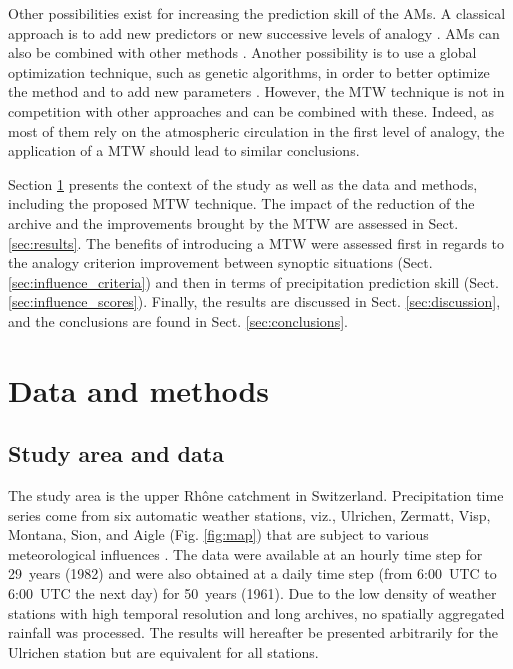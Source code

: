 \documentclass[hess, manuscript]{copernicus}
\begin{document}
	Other possibilities exist for increasing the prediction skill of the AMs. A classical approach is to add new predictors or new successive levels of analogy \citep[see e.g.][]{Horton2012a, BenDaoud2016, Caillouet2016}. AMs can also be combined with other methods \citep[see e.g.][]{Chardon2014}. Another possibility is to use a global optimization technique, such as genetic algorithms, in order to better optimize the method and to add new parameters \citep{Horton2016}. However, the MTW technique is not in competition with other approaches and can be combined with these. Indeed, as most of them rely on the atmospheric circulation in the first level of analogy, the application of a MTW should lead to similar conclusions.
	
	Section \ref{sec:data_methods} presents the context of the study as well as the data and methods, including the proposed MTW technique. The impact of the reduction of the archive and the improvements brought by the MTW are assessed in Sect. \ref{sec:results}. The benefits of introducing a MTW were assessed first in regards to the analogy criterion improvement between synoptic situations (Sect. \ref{sec:influence_criteria}) and then in terms of precipitation prediction skill (Sect. \ref{sec:influence_scores}). Finally, the results are discussed in Sect. \ref{sec:discussion}, and the conclusions are found in Sect. \ref{sec:conclusions}.
	
	
	\section{Data and methods}
	\label{sec:data_methods}
	
	\subsection{Study area and data}
	\label{sec:data}
	
	The study area is the upper Rh\^{o}ne catchment in Switzerland. Precipitation time series come from six automatic weather stations, viz., Ulrichen, Zermatt, Visp, Montana, Sion, and Aigle (Fig. \ref{fig:map}) that are subject to various meteorological influences \citep{Horton2012}. The data were available at an hourly time step for 29~years (1982) and were also obtained at a daily time step (from 6:00~UTC to 6:00~UTC the next day) for 50~years (1961). Due to the low density of weather stations with high temporal resolution and long archives, no spatially aggregated rainfall was processed. The results will hereafter be presented arbitrarily for the Ulrichen station but are equivalent for all stations.
	
\end{document}
